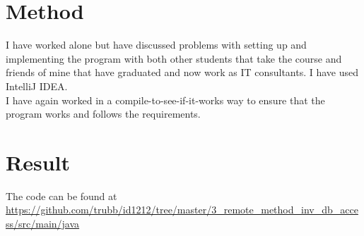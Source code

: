 \documentclass[a4paper]{scrartcl}
\begin{document}
\section{Method}

I have worked alone but have discussed problems with setting up and implementing the program with both other students that take the course and friends of mine that have graduated and now work as IT consultants.
I have used IntelliJ IDEA.\\
I have again worked in a compile-to-see-if-it-works way to ensure that the program works and follows the requirements.

\section{Result}

The code can be found at\\
\url{https://github.com/trubb/id1212/tree/master/3_remote_method_inv_db_access/src/main/java}
\end{document}
